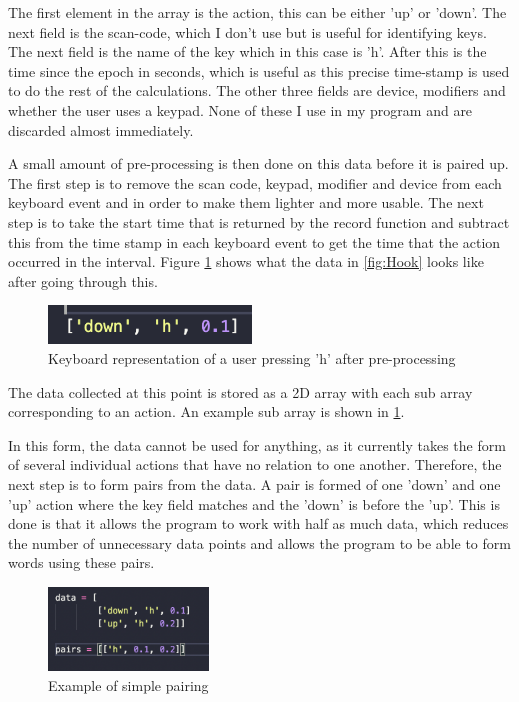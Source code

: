 \documentclass[10pt,a4paper]{report}
\begin{document}
The first element in the array is the action, this can be either 'up' or 'down'. The next field is the scan-code, which I don't use but is useful for identifying keys. The next field is the name of the key which in this case is 'h'. After this is the time since the epoch in seconds, which is useful as this precise time-stamp is used to do the rest of the calculations. The other three fields are device, modifiers and whether the user uses a keypad. None of these I use in my program and are discarded almost immediately.

A small amount of pre-processing is then done on this data before it is paired up. The first step is to remove the scan code, keypad, modifier and device from each keyboard event and in order to make them lighter and more usable. The next step is to take the start time that is returned by the record function and subtract this from the time stamp in each keyboard event to get the time that the action occurred in the interval. Figure \ref{fig:preproc} shows what the data in \ref{fig:Hook} looks like after going through this.

\begin{figure}
	\begin{center}
		\includegraphics[width=0.48\textwidth]{KeyboardEventPreProc}
	\end{center}
	\caption{Keyboard representation of a user pressing 'h' after pre-processing}
	\label{fig:preproc}
\end{figure}

The data collected at this point is stored as a 2D array with each sub array corresponding to an action. An example sub array is shown in \ref{fig:preproc}.

In this form, the data cannot be used for anything, as it currently takes the form of several individual actions that have no relation to one another. Therefore, the next step is to form pairs from the data. A pair is formed of one 'down' and one 'up' action where the key field matches and the 'down' is before the 'up'. This is done is that it allows the program to work with half as much data, which reduces the number of unnecessary data points and allows the program to be able to form words using these pairs.

\begin{figure}
	\begin{center}
		\includegraphics[width=0.38\textwidth]{SimplePairing}
	\end{center}
	\caption{Example of simple pairing}
	\label{fig:SimpPair}
\end{figure}
\end{document}
